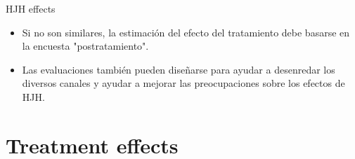 \documentclass[11pt, aspectratio=169, compress]{beamer}
\begin{document}
\begin{frame}{HJH effects}
	\begin{itemize}
		\item Si no son similares, la estimación del efecto del tratamiento debe basarse en la encuesta "postratamiento".
		
		\item Las evaluaciones también pueden diseñarse para ayudar a desenredar los diversos canales y ayudar a mejorar las preocupaciones sobre los efectos de HJH.
	\end{itemize}
\end{frame}
\section{Treatment effects}
\end{document}
